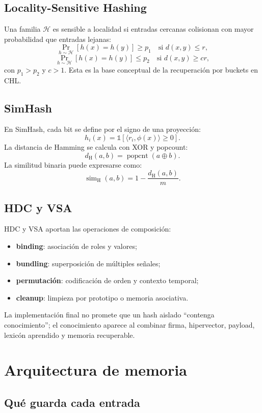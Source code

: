 \documentclass[11pt]{article}
\newcommand{\CHL}{\textsc{CHL}}
\newcommand{\HDC}{\textsc{HDC}}
\newcommand{\VSA}{\textsc{VSA}}
\newcommand{\simh}{\operatorname{sim}_{\mathrm H}}
\newcommand{\hd}{d_{\mathrm H}}
\newcommand{\popcnt}{\operatorname{popcnt}}
\newcommand{\xor}{\oplus}
\begin{document}
\subsection{Locality-Sensitive Hashing}

Una familia \(\mathcal{H}\) es sensible a localidad si entradas cercanas colisionan con mayor probabilidad que entradas lejanas:
\[
\Pr_{h \sim \mathcal{H}}[h(x)=h(y)] \ge p_1 \quad \text{si } d(x,y)\le r,
\]
\[
\Pr_{h \sim \mathcal{H}}[h(x)=h(y)] \le p_2 \quad \text{si } d(x,y)\ge cr,
\]
con \(p_1 > p_2\) y \(c>1\). Esta es la base conceptual de la recuperación por buckets en \CHL{}.

\subsection{SimHash}

En SimHash, cada bit se define por el signo de una proyección:
\[
h_i(x)=\mathbb{1}[\langle r_i,\phi(x)\rangle \ge 0].
\]
La distancia de Hamming se calcula con XOR y popcount:
\[
\hd(a,b)=\popcnt(a \xor b).
\]
La similitud binaria puede expresarse como:
\[
\simh(a,b)=1-\frac{\hd(a,b)}{m}.
\]

\subsection{HDC y VSA}

\HDC{} y \VSA{} aportan las operaciones de composición:
\begin{itemize}
  \item \textbf{binding}: asociación de roles y valores;
  \item \textbf{bundling}: superposición de múltiples señales;
  \item \textbf{permutación}: codificación de orden y contexto temporal;
  \item \textbf{cleanup}: limpieza por prototipo o memoria asociativa.
\end{itemize}

La implementación final no promete que un hash aislado ``contenga conocimiento''; el conocimiento aparece al combinar firma, hipervector, payload, lexicón aprendido y memoria recuperable.

\section{Arquitectura de memoria}

\subsection{Qué guarda cada entrada}
\end{document}
